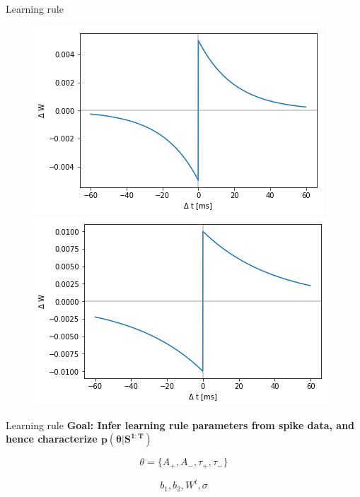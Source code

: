 \documentclass[aspectratio=169]{beamer}
\begin{document}
\begin{frame}{Learning rule}
	    \begin{figure}[]
            \includegraphics[scale=0.4]{LR_true.png}
            \includegraphics[scale=0.4]{LR_0.001_40}
            \vspace{-0.5cm}
            \end{figure}
	
	\end{frame}
	
	\begin{frame}{Learning rule}
        \textbf{Goal: Infer learning rule parameters from spike data, and hence characterize $\mathbf{p(\theta |S^{1:T})}$}
	    
	    \begin{equation}
	        \theta = \{A_+,A_-,\tau_+, \tau_-  \} \nonumber
	    \end{equation}
	    
	    \begin{equation}
	        b_1, b_2, W^t, \sigma
	    \end{equation}
	\end{frame}
	
\end{document}
